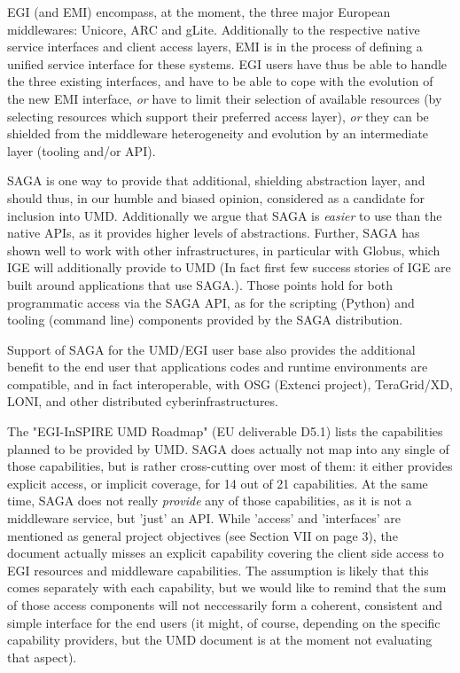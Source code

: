 \documentclass[12pt]{article}
\newcommand{\I}[1]{\textit{#1}}
\begin{document}
EGI (and EMI) encompass, at the moment, the three major European
middlewares: Unicore, ARC and gLite.  Additionally to the respective
native service interfaces and client access layers, EMI is in the
process of defining a unified service interface for these systems.
EGI users have thus be able to handle the three existing interfaces,
and have to be able to cope with the evolution of the new EMI
interface, \I{or} have to limit their selection of available resources
(by selecting resources which support their preferred access layer),
\I{or} they can be shielded from the middleware heterogeneity and
evolution by an intermediate layer (tooling and/or API).
 
SAGA is one way to provide that additional, shielding abstraction
layer, and should thus, in our humble and biased opinion, considered
as a candidate for inclusion into UMD.  Additionally we argue that
SAGA is \I{easier} to use than the native APIs, as it provides higher
levels of abstractions.  Further, SAGA has shown well to work with
other infrastructures, in particular with Globus, which IGE will
additionally provide to UMD (In fact first few success stories of IGE
are built around applications that use SAGA.).  Those points hold for
both programmatic access via the SAGA API, as for the scripting
(Python) and tooling (command line) components provided by the SAGA
distribution.

Support of SAGA for the UMD/EGI user base also provides the additional
benefit to the end user that applications codes and runtime
environments are compatible, and in fact interoperable, with OSG
(Extenci project), TeraGrid/XD, LONI, and other distributed
cyberinfrastructures.

The "EGI-InSPIRE UMD Roadmap" (EU deliverable D5.1) lists the
capabilities planned to be provided by UMD.  SAGA does actually not
map into any single of those capabilities, but is rather cross-cutting
over most of them: it either provides explicit access, or implicit
coverage, for 14 out of 21 capabilities.  At the same time, SAGA does
not really \I{provide} any of those capabilities, as it is not a
middleware service, but 'just' an API.  While 'access' and
'interfaces' are mentioned as general project objectives (see Section
VII on page 3), the document actually misses an explicit capability
covering the client side access to EGI resources and middleware
capabilities.  The assumption is likely that this comes separately
with each capability, but we would like to remind that the sum of
those access components will not neccessarily form a coherent,
consistent and simple interface for the end users (it might, of
course, depending on the specific capability providers, but the UMD
document is at the moment not evaluating that aspect).
\end{document}
